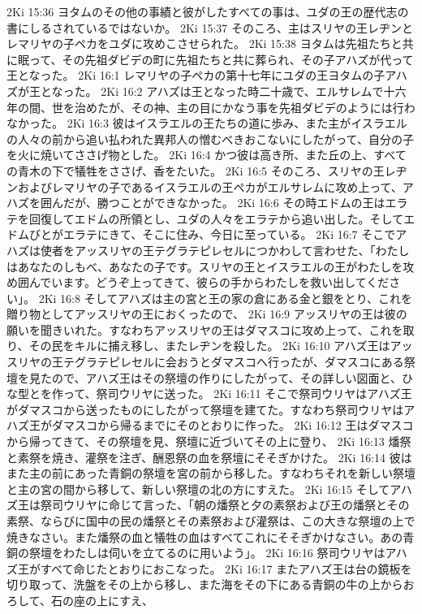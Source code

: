 2Ki 15:36  ヨタムのその他の事績と彼がしたすべての事は、ユダの王の歴代志の書にしるされているではないか。
2Ki 15:37  そのころ、主はスリヤの王レヂンとレマリヤの子ペカをユダに攻めこさせられた。
2Ki 15:38  ヨタムは先祖たちと共に眠って、その先祖ダビデの町に先祖たちと共に葬られ、その子アハズが代って王となった。
2Ki 16:1  レマリヤの子ペカの第十七年にユダの王ヨタムの子アハズが王となった。
2Ki 16:2  アハズは王となった時二十歳で、エルサレムで十六年の間、世を治めたが、その神、主の目にかなう事を先祖ダビデのようには行わなかった。
2Ki 16:3  彼はイスラエルの王たちの道に歩み、また主がイスラエルの人々の前から追い払われた異邦人の憎むべきおこないにしたがって、自分の子を火に焼いてささげ物とした。
2Ki 16:4  かつ彼は高き所、また丘の上、すべての青木の下で犠牲をささげ、香をたいた。
2Ki 16:5  そのころ、スリヤの王レヂンおよびレマリヤの子であるイスラエルの王ペカがエルサレムに攻め上って、アハズを囲んだが、勝つことができなかった。
2Ki 16:6  その時エドムの王はエラテを回復してエドムの所領とし、ユダの人々をエラテから追い出した。そしてエドムびとがエラテにきて、そこに住み、今日に至っている。
2Ki 16:7  そこでアハズは使者をアッスリヤの王テグラテピレセルにつかわして言わせた、「わたしはあなたのしもべ、あなたの子です。スリヤの王とイスラエルの王がわたしを攻め囲んでいます。どうぞ上ってきて、彼らの手からわたしを救い出してください」。
2Ki 16:8  そしてアハズは主の宮と王の家の倉にある金と銀をとり、これを贈り物としてアッスリヤの王におくったので、
2Ki 16:9  アッスリヤの王は彼の願いを聞きいれた。すなわちアッスリヤの王はダマスコに攻め上って、これを取り、その民をキルに捕え移し、またレヂンを殺した。
2Ki 16:10  アハズ王はアッスリヤの王テグラテピレセルに会おうとダマスコへ行ったが、ダマスコにある祭壇を見たので、アハズ王はその祭壇の作りにしたがって、その詳しい図面と、ひな型とを作って、祭司ウリヤに送った。
2Ki 16:11  そこで祭司ウリヤはアハズ王がダマスコから送ったものにしたがって祭壇を建てた。すなわち祭司ウリヤはアハズ王がダマスコから帰るまでにそのとおりに作った。
2Ki 16:12  王はダマスコから帰ってきて、その祭壇を見、祭壇に近づいてその上に登り、
2Ki 16:13  燔祭と素祭を焼き、灌祭を注ぎ、酬恩祭の血を祭壇にそそぎかけた。
2Ki 16:14  彼はまた主の前にあった青銅の祭壇を宮の前から移した。すなわちそれを新しい祭壇と主の宮の間から移して、新しい祭壇の北の方にすえた。
2Ki 16:15  そしてアハズ王は祭司ウリヤに命じて言った、「朝の燔祭と夕の素祭および王の燔祭とその素祭、ならびに国中の民の燔祭とその素祭および灌祭は、この大きな祭壇の上で焼きなさい。また燔祭の血と犠牲の血はすべてこれにそそぎかけなさい。あの青銅の祭壇をわたしは伺いを立てるのに用いよう」。
2Ki 16:16  祭司ウリヤはアハズ王がすべて命じたとおりにおこなった。
2Ki 16:17  またアハズ王は台の鏡板を切り取って、洗盤をその上から移し、また海をその下にある青銅の牛の上からおろして、石の座の上にすえ、

